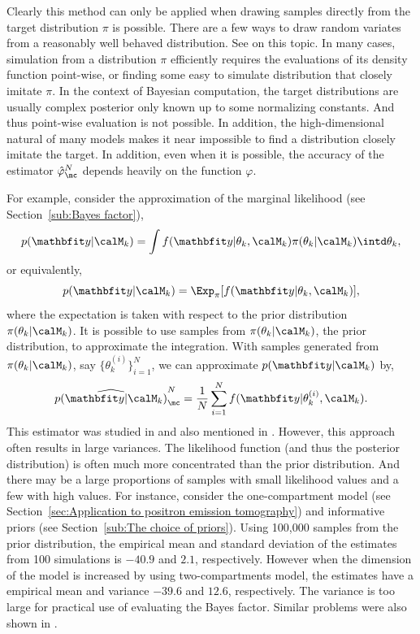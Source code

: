 Clearly this method can only be applied when drawing samples directly from the
target distribution $\pi$ is possible. There are a few ways to draw random
variates from a reasonably well behaved distribution. See
\cite[][chap.~2]{Robert:2004tn} on this topic. In many cases, simulation from
a distribution $\pi$ efficiently requires the evaluations of its density
function point-wise, or finding some easy to simulate distribution that
closely imitate $\pi$. In the context of Bayesian computation, the target
distributions are usually complex posterior only known up to some normalizing
constants. And thus point-wise evaluation is not possible. In addition, the
high-dimensional natural of many models makes it near impossible to find a
distribution closely imitate the target. In addition, even when it is
possible, the accuracy of the estimator $\hat\varphi_{\mc}^N$ depends heavily
on the function $\varphi$.

For example, consider the approximation of the marginal likelihood (see
Section~\ref{sub:Bayes factor}),
\begin{equation*}
  p(\data|\calM_k) =
  \int f(\data|\theta_k,\calM_k)\pi(\theta_k|\calM_k) \intd \theta_k,
\end{equation*}
or equivalently,
\begin{equation}
  p(\data|\calM_k) = \Exp_{\pi}[f(\data|\theta_k,\calM_k)],
  \label{eq:prior expectation}
\end{equation}
where the expectation is taken with respect to the prior distribution
$\pi(\theta_k|\calM_k)$. It is possible to use samples from
$\pi(\theta_k|\calM_k)$, the prior distribution, to approximate the
integration. With samples generated from $\pi(\theta_k|\calM_k)$, say
$\{\theta_k^{(i)}\}_{i=1}^N$, we can approximate $p(\data|\calM_k)$ by,
\begin{equation}
  \widehat{p(\data|\calM_k)}_{\mc}^N
  = \frac{1}{N}\sum_{i=1}^N f(\data|\theta_k^{(i)},\calM_k).
\end{equation}
This estimator was studied in \cite{McCulloch:1991vx} and also mentioned in
\cite{Kass:1995vb}. However, this approach often results in large variances.
The likelihood function (and thus the posterior distribution) is often much
more concentrated than the prior distribution. And there may be a large
proportions of samples with small likelihood values and a few with high
values. For instance, consider the one-compartment \pet model (see
Section~\ref{sec:Application to positron emission tomography}) and
informative priors (see Section~\ref{sub:The choice of priors}). Using 100,000
samples from the prior distribution, the empirical mean and standard deviation
of the estimates from 100 simulations is $-40.9$ and $2.1$, respectively.
However when the dimension of the model is increased by using two-compartments
model, the estimates have a empirical mean and variance $-39.6$ and $12.6$,
respectively. The variance is too large for practical use of evaluating the
Bayes factor. Similar problems were also shown in \cite{McCulloch:1991vx}.

